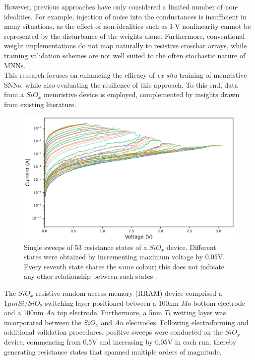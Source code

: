 \noindent However, previous approaches have only considered a limited number of non-idealities. For example, injection of noise into the conductances is insufficient in many situations, as the effect of non-idealities such as I-V nonlinearity cannot be represented by the disturbance of the weights alone. Furthermore, conventional weight implementations do not map naturally to resistive crossbar arrays, while training validation schemes are not well suited to the often stochastic nature of MNNs.\\

\noindent This research focuses on enhancing the efficacy of \textit{ex-situ} training of memristive SNNs, while also evaluating the resilience of this approach. To this end, data from a $SiO_x$ memristive device is employed, complemented by insights drawn from existing literature.\\

\begin{figure}[htbp!] 
\centering    
\includegraphics[width=1\textwidth]{Chapter4/Figs/4e.png}
\caption[Single sweeps of 53 resistance states of a $SiO_x$ device.]{Single sweeps of 53 resistance states of a $SiO_x$ device. Different states were obtained by incrementing maximum voltage by 0.05V. Every seventh state shares the same colour; this does not indicate any other relationship between such states \cite{nikolaos_barmpatsalos_2021_5762184}.}
\label{fig:4e}
\end{figure}

\noindent The $SiO_x$ resistive random-access memory (RRAM) device comprised a $1 \mu m Si/SiO_2$  switching layer positioned between a 100nm $Mo$ bottom electrode and a 100nm $Au$ top electrode. Furthermore, a 5nm $Ti$ wetting layer was incorporated between the $SiO_x$ and $Au$ electrodes. Following electroforming and additional validation procedures, positive sweeps were conducted on the $SiO_x$ device, commencing from 0.5V and increasing by 0.05V in each run, thereby generating resistance states that spanned multiple orders of magnitude.\\

